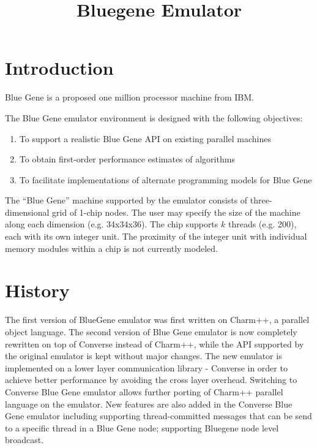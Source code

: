 \documentclass[10pt]{article}
\title{Bluegene Emulator}
\begin{document}
\maketitle

\section{Introduction}

Blue Gene is a proposed one million processor machine from IBM.

The Blue Gene emulator environment is designed with the following
objectives:

\begin{enumerate}
\item To support a realistic Blue Gene API on existing parallel machines

\item To obtain first-order performance estimates of algorithms

\item To facilitate implementations of alternate programming models for
      Blue Gene
\end{enumerate}

The ``Blue Gene'' machine supported by the emulator consists of
three-dimensional grid of 1-chip nodes.  The user may specify the size
of the machine along each dimension (e.g. 34x34x36).  The chip supports
$k$ threads (e.g. 200), each with its own integer unit.  The proximity of
the integer unit with individual memory modules within a chip is not
currently modeled.

\section{History}
 The first version of BlueGene emulator was first written on Charm++, a 
parallel object language. The second version of Blue Gene emulator is now 
completely rewritten on top of Converse instead of Charm++, while the API 
supported by the original emulator is kept without major changes. The new 
emulator is implemented on a lower layer communication library - Converse 
in order to achieve better performance by avoiding the cross layer overhead. 
Switching to Converse Blue Gene emulator allows further porting of Charm++ 
parallel language on the emulator. 
   New features are also added in the Converse Blue Gene emulator including 
supporting thread-committed messages that can be send to a specific thread 
in a Blue Gene node; supporting Bluegene node level broadcast. 
\end{document}
